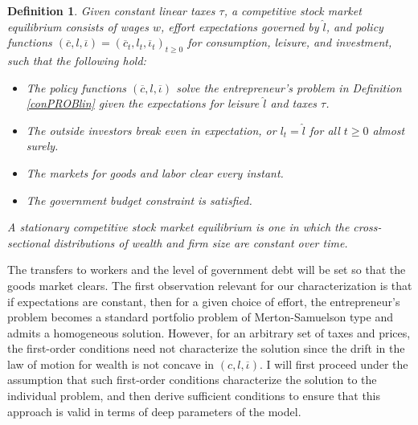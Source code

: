 \documentclass[11pt]{article}
\theoremstyle{plain}
\newtheorem{defn}{Definition}[section]
\begin{document}
\begin{defn} \label{SME}
Given constant linear taxes $\tau$, a competitive stock market equilibrium consists of wages $w$, effort expectations governed by $\hat{l}$, and policy functions $(\overline{c},l,\overline{\iota}) = (\overline{c}_t,l_t,\overline{\iota}_t)_{t\geq0}$ for consumption, leisure, and investment, such that the following hold:
\begin{itemize}
\item The policy functions $(\overline{c},l,\overline{\iota})$ solve the entrepreneur's problem in Definition \ref{conPROBlin} given the expectations for leisure $\hat{l}$ and taxes $\tau$. 
\item The outside investors break even in expectation, or $l_t = \hat{l}$ for all $t\geq0$ almost surely. 
\item The markets for goods and labor clear every instant. 
\item The government budget constraint is satisfied. 
\end{itemize}
A stationary competitive stock market equilibrium is one in which the cross-sectional distributions of wealth and firm size are constant over time. 
\end{defn} 
The transfers to workers and the level of government debt will be set so that the goods market clears. The first observation relevant for our characterization is that if expectations are constant, then for a given choice of effort, the entrepreneur's problem becomes a standard portfolio problem of Merton-Samuelson type and admits a homogeneous solution. However, for an arbitrary set of taxes and prices, the first-order conditions need not characterize the solution since the drift in the law of motion for wealth is not concave in $(c, l, \overline{\iota})$. I will first proceed under the assumption that such first-order conditions characterize the solution to the individual problem, and then derive sufficient conditions to ensure that this approach is valid in terms of deep parameters of the model. 

\end{document}
